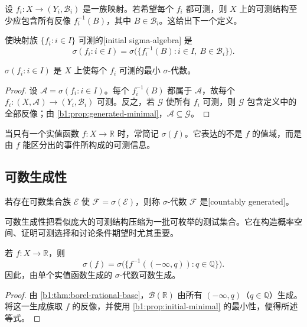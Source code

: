 设 \(f_i:X\to(Y_i,\mathcal B_i)\) 是一族映射。若希望每个 \(f_i\) 都可测，则 \(X\) 上的可测结构至少应包含所有反像 \(f_i^{-1}(B)\)，其中 \(B\in\mathcal B_i\)。这给出下一个定义。

\begin{definition}
\label{b1:def:initial-sigma}
使映射族 \(\{f_i:i\in I\}\) 可测的[initial sigma-algebra] 是
\[
\sigma(f_i:i\in I)
=\sigma\bigl(\{f_i^{-1}(B):i\in I,\ B\in\mathcal B_i\}\bigr).
\]
\end{definition}

\begin{proposition}
\label{b1:prop:initial-minimal}
\(\sigma(f_i:i\in I)\) 是 \(X\) 上使每个 \(f_i\) 可测的最小 \(\sigma\)-代数。
\end{proposition}
\begin{proof}
设 \(\mathcal A=\sigma(f_i:i\in I)\)。每个 \(f_i^{-1}(B)\) 都属于 \(\mathcal A\)，故每个 \(f_i:(X,\mathcal A)\to(Y_i,\mathcal B_i)\) 可测。反之，若 \(\mathcal G\) 使所有 \(f_i\) 可测，则 \(\mathcal G\) 包含定义中的全部反像；由 \cref{b1:prop:generated-minimal}，\(\mathcal A\subseteq\mathcal G\)。
\end{proof}

当只有一个实值函数 \(f:X\to\mathbb R\) 时，常简记 \(\sigma(f)\)。它表达的不是 \(f\) 的值域，而是由 \(f\) 能区分出的事件所构成的可测信息。

\subsection{可数生成性}
\label{b1:subsec:010203}

\begin{definition}
\label{b1:def:countably-generated}
若存在可数集合族 \(\mathcal E\) 使 \(\mathcal F=\sigma(\mathcal E)\)，则称 \(\sigma\)-代数 \(\mathcal F\) 是[countably generated]。
\end{definition}

可数生成性把看似庞大的可测结构压缩为一批可枚举的测试集合。它在构造概率空间、证明可测选择和讨论条件期望时尤其重要。

\begin{proposition}
\label{b1:prop:real-initial-countable}
若 \(f:X\to\mathbb R\)，则
\[
\sigma(f)
=\sigma\bigl(\{f^{-1}((-\infty,q)):q\in\mathbb Q\}\bigr).
\]
因此，由单个实值函数生成的 \(\sigma\)-代数可数生成。
\end{proposition}
\begin{proof}
由 \cref{b1:thm:borel-rational-base}，\(\mathcal B(\mathbb R)\) 由所有 \((-\infty,q)\)（\(q\in\mathbb Q\)）生成。将这一生成族取 \(f\) 的反像，并使用 \cref{b1:prop:initial-minimal} 的最小性，便得所述等式。
\end{proof}

